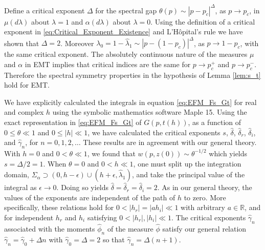 \documentclass[english,12pt,jmp,graphicx]{revtex4-1}
\newcommand{\ph}{\hat{\phi}}
\newcommand{\gh}{\hat{\gamma}}
\newcommand{\dha}{\hat{\delta}}
\begin{document}
Define a critical exponent $\Delta$ for the spectral gap $\theta(p)\sim|p-p_c|^\Delta$,
as $p\to p_c$, in $\mu(d\lambda)$ about $\lambda=1$ and $\alpha(d\lambda)$ about $\lambda=0$. Using the
definition of a critical exponent in
\eqref{eq:Critical_Exponent_Existence} and L'H{\^o}pital's rule we have
shown that $\Delta=2$. Moreover $\lambda_0=1-\hat{\lambda}_1\sim|p-(1-p_c)|^\Delta$, as
$p\to1-p_c$, with the same critical exponent. The absolutely continuous
nature of the measures $\mu$ and $\alpha$ in EMT implies that critical indices
are the same for $p\to p_c^+$ and $p\to p_c^-$. Therefore the spectral
symmetry properties in the hypothesis of Lemma \ref{lem:s_t} hold for
EMT.  

We have explicitly calculated the integrals in equation 
\eqref{eq:EFM_Fs_Gt} for real and complex $h$ using the symbolic
mathematics software Maple 15. Using the exact representation in 
\eqref{eq:EFM_Fs_Gt} of $G(p,t(h))$, as a function of $0\leq\theta\ll1$ and
$0\leq|h|\ll1$, we have calculated the critical exponents
$s$, $\dha$, $\dha_r$, $\dha_i$, and $\gh_n$, for $n=0,1,2,\ldots$ These
results are in agreement with our general theory. With $h=0$ and
$0<\theta\ll1$, we found that $w(p,z(0))\sim\theta^{-1/2}$ which yields
$s=\Delta/2=1$. When $\theta=0$ and $0<h\ll1$, one must split up the integration
domain, $\Sigma_\alpha\supset(0,h-\epsilon)\cup(h+\epsilon,\hat{\lambda}_1)$, and take the principal value of
the integral as $\epsilon\to0$. Doing so yields $\dha=\dha_r=\dha_i=2$. As in
our general theory, the values of the exponents are independent of the
path of $h$ to zero. More 
specifically, these relations hold for $0<|h_r|=|ah_i|\ll1$ with
arbitrary $a\in\mathbb{R}$, and for independent $h_r$ and $h_i$
satisfying $0<|h_r|,|h_i|\ll1$. The critical exponents $\gh_n$
associated with the moments $\ph_n$ of the measure $\ph$ satisfy our
general relation $\gh_n=\gh_0+\Delta n$ with $\gh_0=\Delta=2$ so that
$\gh_n=\Delta(n+1)$.%
\end{document}
